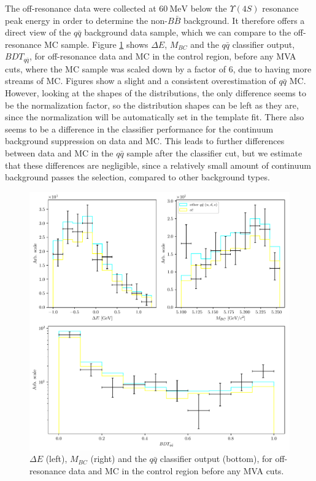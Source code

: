 \documentclass[oneside,a4paper,openany,12pt]{scrbook}
\newcommand {\e}[1]{\mathrm{~#1}}
\begin{document}
The off-resonance data were collected at $60\e{MeV}$ below the $\Upsilon(4S)$ resonance peak energy in order to determine the non-$B\bar B$ background. It therefore offers a direct view of the $q\bar q$ background data sample, which we can compare to the off-resonance MC sample. Figure \ref{fig:offres_control} shows $\Delta E$, $M_{BC}$ and the $q \bar q$ classifier output, $BDT_{q\bar q}$, for off-resonance data and MC in the control region, before any MVA cuts, where the MC sample was scaled down by a factor of $6$, due to having more streams of MC. Figures show a slight and a consistent overestimation of $q\bar q$ MC. However, looking at the shapes of the distributions, the only difference seems to be the normalization factor, so the distribution shapes can be left as they are, since the normalization will be automatically set in the template fit. There also seems to be a difference in the classifier performance for the continuum background suppression on data and MC. This leads to further differences between data and MC in the $q \bar q$ sample after the classifier cut, but we estimate that these differences are negligible, since a relatively small amount of continuum background passes the selection, compared to other background types.

\begin{figure}[H]
\centering
\captionsetup{width=0.8\linewidth}
\includegraphics[width=\linewidth]{fig/offres_control}
\caption{$\Delta E$ (left), $M_{BC}$ (right) and the $q \bar q$ classifier output (bottom), for off-resonance data and MC in the control region before any MVA cuts.}
\label{fig:offres_control}
\end{figure}
\end{document}

